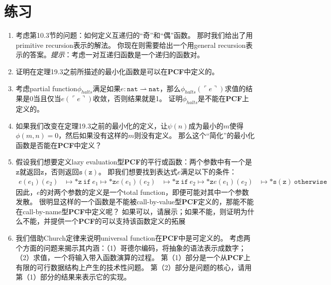 \section*{练习}

\begin{enumerate}[label=\textbf{19.\arabic*.}]
	\item 考虑第10.3节的问题：如何定义互递归的“奇”和“偶”函数。
	那时我们给出了用\gls{primitive recursion}表示的解法。
	你现在则需要给出一个用\gls{general recursion}表示的答案。\textit{提示}：考虑一对互递归函数是一个递归的函数对。
	\item 
	证明在定理19.3之前所描述的最小化函数是可以在\textbf{PCF}中定义的。
	\item
	考虑\gls{partial function}\(\phi_{halts}\)满足如果\(e: \mathtt{nat} \rightharpoonup \mathtt{nat}\)，那么\(\phi_{halts}(\ulcorner e \urcorner)\)求值的结果是0当且仅当\(e(\ulcorner e \urcorner)\)收敛，否则结果就是1。
	证明\(\phi_{halts}\)是不能在\textbf{PCF}上定义的。
	\item 
	如果我们改变在定理19.3之前的最小化的定义，让\(\psi(n)\)成为最小的\(m\)使得\(\phi(m, n) = 0\)，然后如果没有这样的\(m\)则没有定义。
	那么这个“简化”的最小化函数是否能在\textbf{PCF}中定义？
	\item
	假设我们想要定义\gls{lazy evaluation}型\textbf{PCF}的平行或函数：两个参数中有一个是\(\mathtt{z}\)就返回\(\mathtt{z}\)，否则返回\(\mathtt{s}(\mathtt{z})\)。
	即我们想要找到表达式\(e\)满足以下的条件：
	\begin{align*}
		e(e_1)(e_2) & \longmapsto * \mathtt{z}\ \mathtt{if}\ e_1 \longmapsto * \mathtt{z}
		e(e_1)(e_2) & \longmapsto * \mathtt{z}\ \mathtt{if}\ e_2 \longmapsto * \mathtt{z}
		e(e_1)(e_2) & \longmapsto * \mathtt{s}(\mathtt{z})\ \mathtt{otherwise}
	\end{align*}
	因此，\(e\)的对两个参数的定义是一个\gls{total function}，即便可能对其中一个参数发散。
	很明显这样的一个函数是不能被\gls{call-by-value}型\textbf{PCF}定义的，那能不能在\gls{call-by-name}型\textbf{PCF}中定义呢？
	如果可以，请展示；如果不能，则证明为什么不能，并提供一个\textbf{PCF}的可以支持该函数定义的拓展
	\item
	我们借助Church定律来说明\gls{universal function}在\textbf{PCF}中是可定义的。
	考虑两个方面的问题来揭示其内涵：（1）哥德尔编码，将抽象的语法表示成数字；（2）求值，一个将输入带入函数演算的过程。
	第（1）部分是一个从\textbf{PCF}上有限的可行数据结构上产生的技术性问题。
	第（2）部分是问题的核心，请用第（1）部分的结果来表示它的实现。
\end{enumerate}